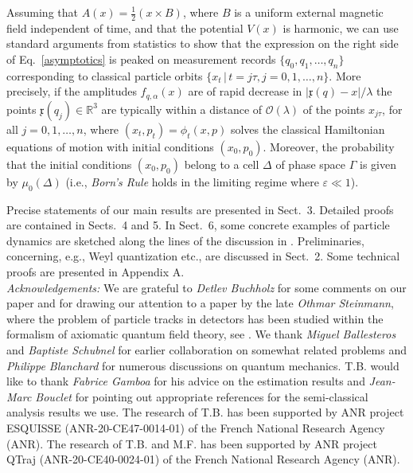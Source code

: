 \documentclass[11pt]{article}
\begin{document}
Assuming that $A(x) = \frac{1}{2}(x \times B)$, where $B$ is a uniform external magnetic field independent of time, and that
the potential $V(x)$ is harmonic, we can use standard arguments from statistics to show that the expression on the right 
side of Eq.~\eqref{asymptotics} is peaked on measurement records 
$\big\{q_0,q_1, \dots, q_n\big\}$ corresponding to classical particle orbits $\{x_t \,|\,t= j\tau, j=0, 1, \dots, n\}$. More precisely,
if the amplitudes $f_{q, \alpha}(x)$ are of rapid decrease in $\vert \mathfrak{x}(q)-x \vert/\lambda$ the points
$\mathfrak{x}(q_j)\in \mathbb{R}^{3}$ are typically within a distance of $\mathcal{O}(\lambda)$ of the points $x_{j\tau}$, 
for all $j=0,1, \dots, n$, where $(x_t, p_t) = \phi_{t}(x,p)$ solves the classical Hamiltonian equations of motion 
with initial conditions $(x_0,p_0)$. Moreover, the probability that the initial conditions $(x_0,p_0)$ belong to a cell 
$\Delta$ of phase space $\Gamma$ is given by $\mu_{0}(\Delta)$ (i.e., \textit{Born's Rule} holds in the limiting regime
where $\varepsilon \ll 1$).

Precise statements of our main results are presented in Sect.~3. Detailed proofs are contained in Sects.~4 
and 5. In Sect.~6, some concrete examples of particle dynamics are sketched along the lines of the discussion 
in \cite{BBFF}. Preliminaries, concerning, e.g., Weyl quantization etc., are discussed in Sect.~2. 
Some technical proofs are presented in Appendix A.\\

\textit{Acknowledgements:} We are grateful to \textit{Detlev Buchholz} for some comments on our paper \cite{BBFF} and 
for drawing our attention to a paper by the late \textit{Othmar Steinmann}, where the problem of particle 
tracks in detectors has been studied within the formalism of axiomatic quantum field theory, see \cite{Steinmann}. We thank
\textit{Miguel Ballesteros} and \textit{Baptiste Schubnel} for earlier collaboration on somewhat related problems and \textit{Philippe Blanchard} for numerous discussions on quantum mechanics.
T.B. would like to thank \textit{Fabrice Gamboa} for his advice on the estimation results and \textit{Jean-Marc Bouclet} for pointing out appropriate references for the semi-classical analysis results we use. The research of T.B. has been supported by ANR project ESQUISSE (ANR-20-CE47-0014-01) of the French National Research Agency (ANR). The research of T.B. and M.F. has been supported
by ANR project QTraj (ANR-20-CE40-0024-01) of the French National Research Agency (ANR).
\end{document}
